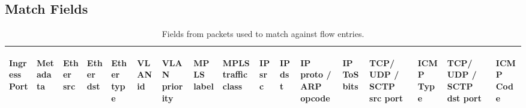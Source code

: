 \documentclass[10pt]{article}
\begin{document}
\subsection{Match Fields}
\begin{table}[hbp]
\centering
\footnotesize
\begin{tabularx}{\textwidth}{ |X|X|X|X|X|X|X|X|X|X|X|X|X|XX|XX| }
\hline
\begin{sideways}Ingress Port \end{sideways} &
\begin{sideways}Metadata \end{sideways} &
\begin{sideways}Ether src \end{sideways} &
\begin{sideways}Ether dst \end{sideways} &
\begin{sideways}Ether type \end{sideways} &
\begin{sideways}VLAN id \end{sideways} &
\begin{sideways}VLAN priority \end{sideways} &
\begin{sideways}MPLS label \end{sideways} &
\begin{sideways}MPLS traffic class \end{sideways} &
\begin{sideways}IP src \end{sideways} &
\begin{sideways}IP dst \end{sideways} &
\begin{sideways}IP proto / ARP opcode \end{sideways} &
\begin{sideways}IP ToS bits \end{sideways} &
\begin{sideways}TCP/ UDP / SCTP src port \end{sideways} &
\begin{sideways}ICMP Type \end{sideways} &
\begin{sideways}TCP/ UDP / SCTP dst port \end{sideways} &
\begin{sideways}ICMP Code \end{sideways}
\\ 
\hline
\end{tabularx}
\caption{Fields from packets used to match against flow entries.}
\label{table:match fields}
\end{table}
\end{document}
